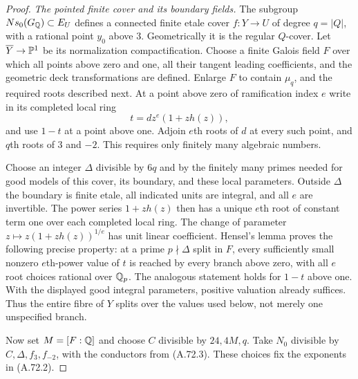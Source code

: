 \begin{proof}
\emph{The pointed finite cover and its boundary fields.}
The subgroup $N s_0(G_\mathbb Q)\subset E_U$ defines a connected finite
etale cover $f:Y\to U$ of degree $q=|Q|$, with a rational point
$y_0$ above $3$.  Geometrically it is the regular $Q$-cover.
Let $\overline Y\to\mathbb P^1$ be its normalization compactification.
Choose a finite Galois field $F$ over which all points above zero
and one, all their tangent leading coefficients, and the geometric
deck transformations are defined.  Enlarge $F$ to contain
$\mu_q$, and the required roots described next.
At a point above zero of ramification index $e$ write in its
completed local ring
\[
                   t=d z^e(1+z h(z)),
\tag{A.72.6}
\]
and use $1-t$ at a point above one.  Adjoin $e$th roots of $d$
at every such point, and $q$th roots of $3$ and $-2$.
This requires only finitely many algebraic numbers.

Choose an integer $\Delta$ divisible by $6q$ and by the finitely
many primes needed for good models of this cover, its boundary,
and these local parameters.  Outside $\Delta$ the boundary is
finite etale, all indicated units are integral, and all $e$ are
invertible.  The power series $1+zh(z)$ then has a unique $e$th
root of constant term one over each completed local ring.
The change of parameter $z\mapsto z(1+zh(z))^{1/e}$ has unit
linear coefficient.  Hensel's lemma proves the following precise
property: at a prime $p\nmid\Delta$ split in $F$, every sufficiently
small nonzero $e$th-power value of $t$ is reached by every branch
above zero, with all $e$ root choices rational over $\mathbb Q_p$.
The analogous statement holds for $1-t$ above one.
With the displayed good integral parameters, positive valuation
already suffices.  Thus the entire fibre of $Y$ splits over the
values used below, not merely one unspecified branch.

Now set $M=[F:\mathbb Q]$ and choose $C$ divisible by $24,4M,q$.
Take $N_0$ divisible by $C,\Delta,f_3,f_{-2}$, with the conductors
from (A.72.3).  These choices fix the exponents in (A.72.2).


\end{proof}
